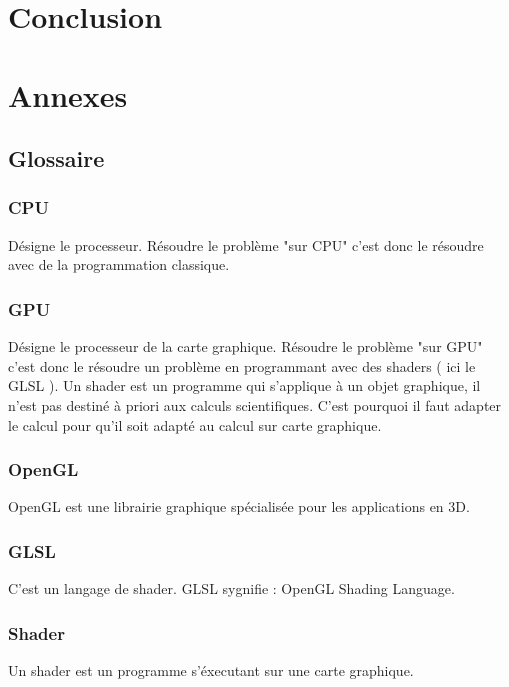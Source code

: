 \documentclass[a4paper,10pt]{article}
\begin{document}
\section{Conclusion}



\section{Annexes}

\subsection{Glossaire}

\subsubsection{CPU}
Désigne le processeur. Résoudre le problème "sur CPU" c'est donc le résoudre avec
de la programmation classique.
\subsubsection{GPU}
Désigne le processeur de la carte graphique. Résoudre le problème "sur GPU" c'est donc le résoudre 
un problème en programmant avec des shaders ( ici le GLSL ). Un shader est un programme qui s'applique à 
un objet graphique, il n'est pas destiné à priori aux calculs scientifiques. C'est pourquoi
il faut adapter le calcul pour qu'il soit adapté au calcul sur carte graphique.
\subsubsection{OpenGL}
OpenGL est une librairie graphique spécialisée pour les applications en 3D.
\subsubsection{GLSL}
C'est un langage de shader. GLSL sygnifie : OpenGL Shading Language.
\subsubsection{Shader}
Un shader est un programme s'éxecutant sur une carte graphique.

\end{document}
